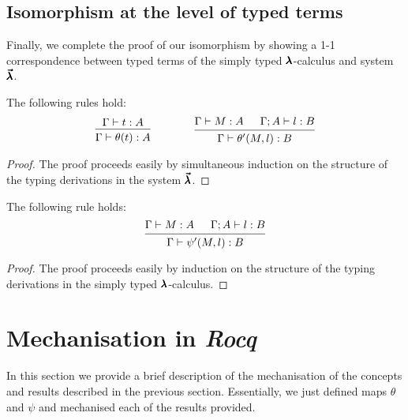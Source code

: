 \subsection{Isomorphism at the level of typed terms}

Finally, we complete the proof of our isomorphism by showing a 1-1 correspondence between typed terms of the simply typed $\pmb{\lambda}$-calculus and system $\pmb{\vec \lambda}$.

\begin{theorem}
  The following rules hold:
  \[ \begin{prooftree}
      \hypo{ \Gamma \vdash t : A }
      \infer1{ \Gamma \vdash \theta(t) : A } 
    \end{prooftree}
    \qquad \qquad
    \begin{prooftree}
      \hypo{ \Gamma \vdash M : A }
      \hypo{ \Gamma ; A \vdash l : B }
      \infer2{ \Gamma \vdash \theta'(M, l) : B }.
    \end{prooftree} \]
\end{theorem}
\begin{proof}
  The proof proceeds easily by simultaneous induction on the structure of the typing derivations in the system $\pmb{\vec \lambda}$.
\end{proof}

\begin{theorem}
  The following rule holds:
  \[ \begin{prooftree}
      \hypo{ \Gamma \vdash M : A }
      \hypo{ \Gamma ; A \vdash l : B }
      \infer2{ \Gamma \vdash \psi'(M, l) : B }.
    \end{prooftree} \]
\end{theorem}
\begin{proof}
  The proof proceeds easily by induction on the structure of the typing derivations in the simply typed $\pmb{\lambda}$-calculus.
\end{proof}


\section{Mechanisation in \textit{Rocq}}

In this section we provide a brief description of the mechanisation of the concepts and results described in the previous section.
Essentially, we just defined maps $\theta$ and $\psi$ and mechanised each of the results provided.

